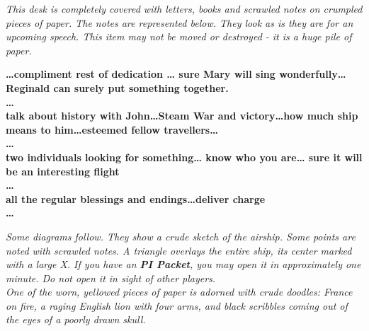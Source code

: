 \documentclass[white]{airship}
\begin{document}
\name{\wOpiumPlot{}} %

{\it This desk is completely covered with letters, books and scrawled notes on crumpled pieces of paper. The notes are represented below. They look as is they are for an upcoming speech. This item may not be moved or destroyed - it is a huge pile of paper.}

{\bf
{\ldots}compliment rest of dedication {\ldots} sure Mary will sing wonderfully{\ldots} Reginald can surely put something together.
\\
{\ldots}
\\
talk about history with John{\ldots}Steam War and victory{\ldots}how much ship means to him{\ldots}esteemed fellow travellers{\ldots}
\\
{\ldots}
\\
two individuals looking for something{\ldots} know who you are{\ldots} sure it will be an interesting flight
\\
{\ldots}
\\
all the regular blessings and endings{\ldots}deliver charge
\\
{\ldots}
\\
}

{\it Some diagrams follow. They show a crude sketch of the airship. Some points are noted with scrawled notes. A triangle overlays the entire ship, its center marked with a large X. If you have an {\bf PI Packet}, you may open it in approximately one minute. Do not open it in sight of other players.}
\\

{\it One of the worn, yellowed pieces of paper is adorned with crude doodles: France on fire, a raging English lion with four arms, and black scribbles coming out of the eyes of a poorly drawn skull.}
\end{document}
